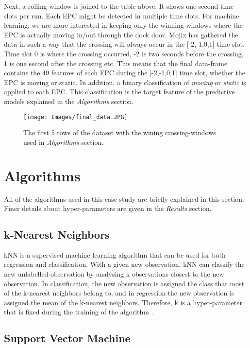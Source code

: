 \documentclass{article}
\begin{document}
Next, a rolling window is joined to the table above. 
It shows one-second time slots per run. 
Each \ac{EPC} might be detected in multiple time slots. 
For machine learning, we are more interested in keeping only the winning windows where the \ac{EPC} is actually moving in/out through the dock door.
Mojix has gathered the data in such a way that the crossing will always occur in the [-2,-1,0,1] time slot.
Time slot 0 is where the crossing occurred, -2 is two seconds before the crossing, 1 is one second after the crossing etc.
This means that the final data-frame contains the 49 features of each \ac{EPC} during the [-2,-1,0,1] time slot, whether the \ac{EPC} is moving or static. 
In addition, a binary classification of \emph{moving} or \emph{static} is applied to each \ac{EPC}. 
This classification is the target feature of the predictive models explained in the \emph{Algorithms} section.
%
\begin{figure}[h]
    \centering
    \texttt{[image: Images/final\_data.JPG]}
    \caption{The first 5 rows of the dataset with the wining crossing-windows used in \emph{Algorithms} section.}
    \label{fig:final_dataset}
\end{figure}
%

\section{Algorithms}

All of the algorithms used in this case study are briefly explained in this section.
Finer details about hyper-parameters are given in the \emph{Results} section.

\subsection{k-Nearest Neighbors}

\ac{kNN} is a supervised machine learning algorithm that can be used for both regression and classification. 
With a given new observation, \ac{kNN} can classify the new unlabelled observation by analysing k observations closest to the new observation.
In classification, the new observation is assigned the class that most of the k-nearest neighbors belong to, and in regression the new observation is assigned the mean of the k-nearest neighbors.
Therefore, k is a hyper-parameter that is fixed during the training of the algorithm \citep{christopher_2021}.

\subsection{Support Vector Machine}
\end{document}
